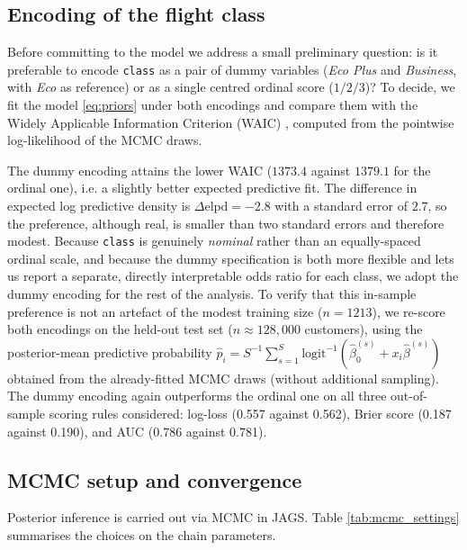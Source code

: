\subsection{Encoding of the flight class}
\label{sec:class-encoding}
Before committing to the model we address a small preliminary question: is it
preferable to encode \texttt{class} as a pair of dummy variables
(\textit{Eco Plus} and \textit{Business}, with \textit{Eco} as reference) or as a
single centred ordinal score ($1/2/3$)? To decide, we fit the model
\eqref{eq:priors} under both encodings and compare them with the Widely
Applicable Information Criterion (WAIC) \cite{bl_book}, computed from the pointwise
log-likelihood of the MCMC draws.

The dummy encoding attains the lower WAIC ($1373.4$ against $1379.1$ for the
ordinal one), i.e. a slightly better expected predictive fit. The difference in
expected log predictive density is $\Delta\text{elpd} = -2.8$ with a standard
error of $2.7$, so the preference, although real, is smaller than two standard
errors and therefore modest. Because \texttt{class} is genuinely
\emph{nominal} rather than an equally-spaced ordinal scale, and because the
dummy specification is both more flexible and lets us report a separate,
directly interpretable odds ratio for each class, we adopt the dummy encoding
for the rest of the analysis. To verify that this in-sample preference is not an artefact of the modest
training size ($n=1213$), we re-score both encodings on the held-out test
set ($n\approx128{,}000$ customers), using the posterior-mean predictive
probability $\hat p_i = S^{-1}\sum_{s=1}^{S}\mathrm{logit}^{-1}\!\left(\hat\beta_0^{(s)} + x_i\hat\beta^{(s)}\right)$
obtained from the already-fitted MCMC draws (without additional sampling). The dummy encoding again outperforms the ordinal one on all three
out-of-sample scoring rules considered: log-loss (0.557 against 0.562),
Brier score (0.187 against 0.190), and AUC (0.786 against 0.781). 

\subsection{MCMC setup and convergence}
Posterior inference is carried out via MCMC in JAGS. Table
\ref{tab:mcmc_settings} summarises the choices on the chain parameters.

